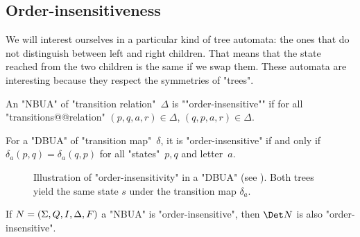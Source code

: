 \documentclass[twoside]{article}
\begin{document}
\subsection{Order-insensitiveness}\label{sec:OrderAutomata}

We will interest ourselves in a particular kind of tree automata: the ones that do not distinguish between left and right children.
That means that the state reached from the two children is the same if we swap them. These automata are
interesting because they respect the symmetries of "trees".

\begin{definition}
	An "NBUA" of "transition relation"~$\Delta$ is ""order-insensitive"" if for all "transitions@@relation" $(p,q,a,r) \in \Delta$,
	$(q,p,a,r) \in \Delta$.
\end{definition}

\begin{remark}\label{def:order-insensitive}
	For a "DBUA" of "transition map"~$\delta$, it is "order-insensitive" if and only if
	$\delta_a (p,q) = \delta_a (q,p)$ for all "states"~$p,q$ and letter~$a$.
\end{remark}


\begin{figure}[h]
	\centering
	\caption{Illustration of "order-insensitivity" in a "DBUA" (see ).
		Both trees yield the same state $s$ under the transition map $\delta_a$.}
	\label{fig:order-insensitivity}
\end{figure}



\begin{lemma}
	If $N = (\Sigma, Q, I, \Delta, F)$ a "NBUA" is "order-insensitive", then $\Det N$ is also "order-insensitive".
\end{lemma}
\end{document}
